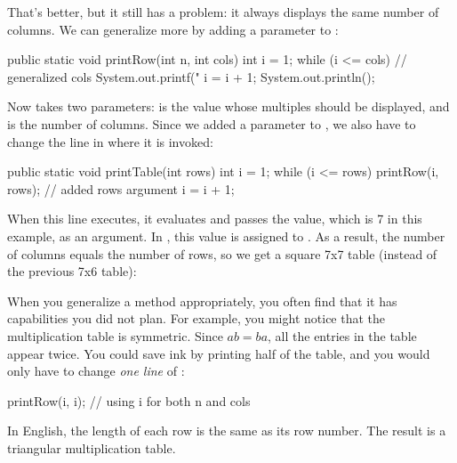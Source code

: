 That's better, but it still has a problem: it always displays the same number of columns.
We can generalize more by adding a parameter to :

\begin{code}
public static void printRow(int n, int cols) {
    int i = 1;
    while (i <= cols) {  // generalized cols
        System.out.printf("%
        i = i + 1;
    }
    System.out.println();
}
\end{code}

Now  takes two parameters:  is the value whose multiples should be displayed, and  is the number of columns.
Since we added a parameter to , we also have to change the line in  where it is invoked:

\begin{code}
public static void printTable(int rows) {
    int i = 1;
    while (i <= rows) {
        printRow(i, rows);  // added rows argument
        i = i + 1;
    }
}
\end{code}

When this line executes, it evaluates  and passes the value, which is 7 in this example, as an argument.
In , this value is assigned to .
As a result, the number of columns equals the number of rows, so we get a square 7x7 table (instead of the previous 7x6 table):


When you generalize a method appropriately, you often find that it has capabilities you did not plan.
For example, you might notice that the multiplication table is symmetric.
Since $ab = ba$, all the entries in the table appear twice.
You could save ink by printing half of the table, and you would only have to change {\em one line} of :

\begin{code}
printRow(i, i);  // using i for both n and cols
\end{code}

In English, the length of each row is the same as its row number.
The result is a triangular multiplication table.

